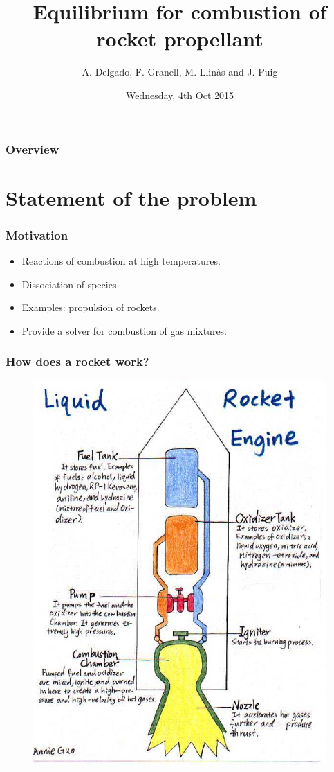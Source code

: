 \documentclass{beamer}
\title[Combustion of rocket propellant]{Equilibrium for combustion of rocket propellant}
\author[Team Rocket]{A. Delgado, F. Granell, M. Llin\`as and J. Puig}
\institute[MMT]{Mathematical Models of Technology}
\date{Wednesday, 4th Oct 2015}
\begin{document}
\begin{frame}
\titlepage
\end{frame}

\begin{frame}
\frametitle{Overview}
\tableofcontents
\end{frame}


\section{Statement of the problem}


\begin{frame}
\frametitle{Motivation}
\begin{itemize}
\item Reactions of combustion at high temperatures.
\item Dissociation of species.
\item Examples: propulsion of rockets.
\item Provide a solver for combustion of gas mixtures.
\end{itemize}
\end{frame}


\begin{frame}
\frametitle{How does a rocket work?}
\begin{figure}
\includegraphics[width=0.5\linewidth]{rocket}
\end{figure}
\end{frame}
\end{document}
